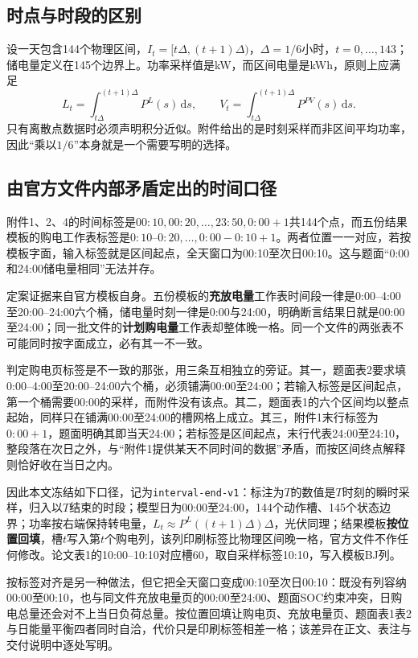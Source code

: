\documentclass[UTF8,a4paper,zihao=-4,fontset=fandol]{ctexart}
\begin{document}
\subsection{时点与时段的区别}
设一天包含144个物理区间，$I_t=[t\Delta,(t+1)\Delta)$，$\Delta=1/6$小时，$t=0,\ldots,143$；储电量定义在145个边界上。功率采样值是kW，而区间电量是kWh，原则上应满足
\begin{equation}
 L_t=\int_{t\Delta}^{(t+1)\Delta}P^L(s)\,\mathrm ds,\qquad V_t=\int_{t\Delta}^{(t+1)\Delta}P^{PV}(s)\,\mathrm ds.
\end{equation}
只有离散点数据时必须声明积分近似。附件给出的是时刻采样而非区间平均功率，因此“乘以$1/6$”本身就是一个需要写明的选择。

\subsection{由官方文件内部矛盾定出的时间口径}\label{sec:time}
附件1、2、4的时间标签是$00{:}10,00{:}20,\ldots,23{:}50,0{:}00{+}1$共144个点，而五份结果模板的购电工作表标签是$0{:}10\text{--}0{:}20,\ldots,0{:}00{-}0{:}10{+}1$。两者位置一一对应，若按模板字面，输入标签就是区间起点，全天窗口为00:10至次日00:10。这与题面“0:00和24:00储电量相同”无法并存。

定案证据来自官方模板自身。五份模板的\textbf{充放电量}工作表时间段一律是0:00--4:00至20:00--24:00六个桶，储电量时刻一律是0:00与24:00，明确断言结果日就是00:00至24:00；同一批文件的\textbf{计划购电量}工作表却整体晚一格。同一个文件的两张表不可能同时按字面成立，必有其一不一致。

判定购电页标签是不一致的那张，用三条互相独立的旁证。其一，题面表2要求填0:00--4:00至20:00--24:00六个桶，必须铺满00:00至24:00；若输入标签是区间起点，第一个桶需要00:00的采样，而附件没有该点。其二，题面表1的六个区间均以整点起始，同样只在铺满00:00至24:00的槽网格上成立。其三，附件1末行标签为$0{:}00{+}1$，题面明确其即当天24:00；若标签是区间起点，末行代表24:00至24:10，整段落在次日之外，与“附件1提供某天不同时间的数据”矛盾，而按区间终点解释则恰好收在当日之内。

因此本文冻结如下口径，记为\texttt{interval-end-v1}：标注为$T$的数值是$T$时刻的瞬时采样，归入以$T$结束的时段；模型日为00:00至24:00，144个动作槽、145个状态边界；功率按右端保持转电量，$L_t\approx P^L((t+1)\Delta)\Delta$，光伏同理；结果模板\textbf{按位置回填}，槽$t$写入第$t$个购电列，该列印刷标签比物理区间晚一格，官方文件不作任何修改。论文表1的10:00--10:10对应槽60，取自采样标签10:10，写入模板BJ列。

按标签对齐是另一种做法，但它把全天窗口变成00:10至次日00:10：既没有列容纳00:00至00:10，也与同文件充放电量页的00:00至24:00、题面SOC约束冲突，日购电总量还会对不上当日负荷总量。按位置回填让购电页、充放电量页、题面表1表2与日能量平衡四者同时自洽，代价只是印刷标签相差一格；该差异在正文、表注与交付说明中逐处写明。
\end{document}
